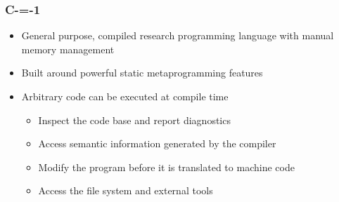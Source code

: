 \begin{frame}
	\frametitle{C-=-1}

	\begin{itemize}
		\item General purpose, compiled research programming language with manual memory management
		\item Built around powerful static metaprogramming features
		\item Arbitrary code can be executed at compile time\begin{itemize}
			\item Inspect the code base and report diagnostics
			\item Access semantic information generated by the compiler
			\item Modify the program before it is translated to machine code
			\item Access the file system and external tools
		\end{itemize}
	\end{itemize}

\end{frame}

